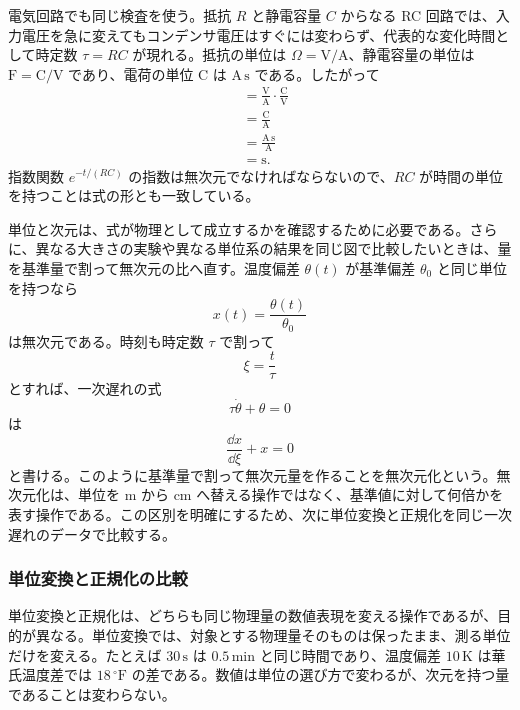 \begin{example}[RC 回路の時定数の次元確認]
電気回路でも同じ検査を使う。抵抗 $R$ と静電容量 $C$ からなる RC 回路では、入力電圧を急に変えてもコンデンサ電圧はすぐには変わらず、代表的な変化時間として時定数 $\tau=RC$ が現れる。抵抗の単位は $\Omega=\mathrm{V/A}$、静電容量の単位は $\mathrm{F}=\mathrm{C/V}$ であり、電荷の単位 C は $\mathrm{A\,s}$ である。したがって
\begin{align}
  [RC]
  &=\frac{\mathrm{V}}{\mathrm{A}}\cdot
    \frac{\mathrm{C}}{\mathrm{V}}\\
  &=\frac{\mathrm{C}}{\mathrm{A}}\\
  &=\frac{\mathrm{A\,s}}{\mathrm{A}}\\
  &=\mathrm{s}.
\end{align}
指数関数 $e^{-t/(RC)}$ の指数は無次元でなければならないので、$RC$ が時間の単位を持つことは式の形とも一致している。
\end{example}

単位と次元は、式が物理として成立するかを確認するために必要である。さらに、異なる大きさの実験や異なる単位系の結果を同じ図で比較したいときは、量を基準量で割って無次元の比へ直す。温度偏差 $\theta(t)$ が基準偏差 $\theta_0$ と同じ単位を持つなら
\begin{equation}
  x(t)=\frac{\theta(t)}{\theta_0}
\end{equation}
は無次元である。時刻も時定数 $\tau$ で割って
\begin{equation}
  \xi=\frac{t}{\tau}
\end{equation}
とすれば、一次遅れの式
\begin{equation}
  \tau\dot{\theta}+\theta=0
\end{equation}
は
\begin{equation}
  \frac{\dd x}{\dd \xi}+x=0
\end{equation}
と書ける。このように基準量で割って無次元量を作ることを無次元化という。無次元化は、単位を m から cm へ替える操作ではなく、基準値に対して何倍かを表す操作である。この区別を明確にするため、次に単位変換と正規化を同じ一次遅れのデータで比較する。

\subsubsection{単位変換と正規化の比較}

単位変換と正規化は、どちらも同じ物理量の数値表現を変える操作であるが、目的が異なる。単位変換では、対象とする物理量そのものは保ったまま、測る単位だけを変える。たとえば $30\,\mathrm{s}$ は $0.5\,\mathrm{min}$ と同じ時間であり、温度偏差 $10\,\mathrm{K}$ は華氏温度差では $18\,^\circ\mathrm{F}$ の差である。数値は単位の選び方で変わるが、次元を持つ量であることは変わらない。

